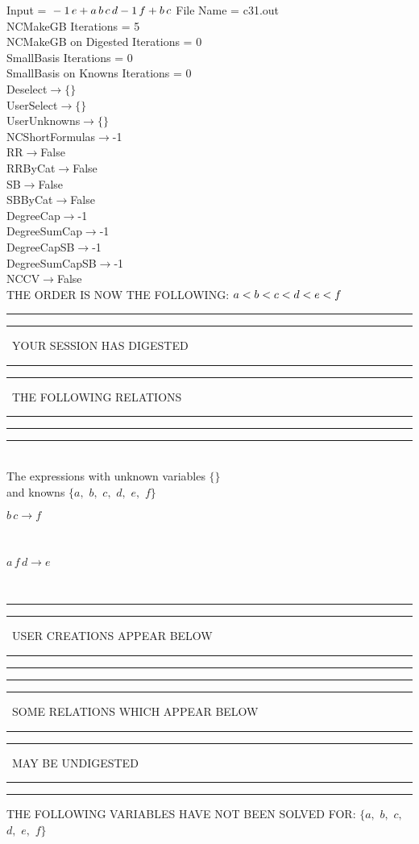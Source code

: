 \documentclass[rep10,leqno]{report}
\begin{document}
\normalsize
\baselineskip=12pt
\noindent
Input = 
$
\\-1\,
 e + a\,
 b\,
 c\,
 d\\
-1\,
 f + b\,
 c\\
$
File Name = c31.out\\
NCMakeGB Iterations = 5\\
NCMakeGB on Digested Iterations = 0\\
SmallBasis Iterations = 0\\
SmallBasis on Knowns Iterations = 0\\
Deselect$\rightarrow \{\}$\\
UserSelect$\rightarrow \{\}$\\
UserUnknowns$\rightarrow \{\}$\\
NCShortFormulas$\rightarrow$-1\\
RR$\rightarrow $False\\
RRByCat$\rightarrow $False\\
SB$\rightarrow $False\\
SBByCat$\rightarrow $False\\
DegreeCap$\rightarrow $-1\\
DegreeSumCap$\rightarrow $-1\\
DegreeCapSB$\rightarrow $-1\\
DegreeSumCapSB$\rightarrow $-1\\
NCCV$\rightarrow $False\\
THE ORDER IS NOW THE FOLLOWING:\hfil\break
$
a<b<c<d<e<f\\
$
\rule[2pt]{6in}{4pt}\hfil\break
\rule[2pt]{1.879in}{4pt}
\ YOUR SESSION HAS DIGESTED\ 
\rule[2pt]{1.879in}{4pt}\hfil\break
\rule[2pt]{1.923in}{4pt}
\ THE FOLLOWING RELATIONS\ 
\rule[2pt]{1.923in}{4pt}\hfil\break
\rule[2pt]{6in}{4pt}\hfil\break
\rule[3pt]{6in}{.7pt}\\
The expressions with unknown variables $\{\}$\\
and knowns $\{a,
$ $
b,
$ $
c,
$ $
d,
$ $
e,
$ $
f\}$\smallskip\\
\begin{minipage}{6in}
$
b\,
 c\rightarrow f
$
\end{minipage}\medskip \\
\begin{minipage}{6in}
$
a\,
 f\,
 d\rightarrow e
$
\end{minipage}\\
\rule[2pt]{6in}{1pt}\hfil\break
\rule[2.5pt]{1.701in}{1pt}
\ USER CREATIONS APPEAR BELOW\ 
\rule[2.5pt]{1.701in}{1pt}\hfil\break
\rule[2pt]{6in}{1pt}\hfil\break
\rule[2pt]{6in}{4pt}\hfil\break
\rule[2pt]{1.45in}{4pt}
\ SOME RELATIONS WHICH APPEAR BELOW\ 
\rule[2pt]{1.45in}{4pt}\hfil\break
\rule[2pt]{2.18in}{4pt}
\ MAY BE UNDIGESTED\ 
\rule[2pt]{2.18in}{4pt}\hfil\break
\rule[2pt]{6in}{4pt}\hfil\break
THE FOLLOWING VARIABLES HAVE NOT BEEN SOLVED FOR:\hfil\break
$\{a,
$ $
b,
$ $
c,
$ $
d,
$ $
e,
$ $
f\}$
\smallskip\\
\vspace{10pt}
\end{document}
